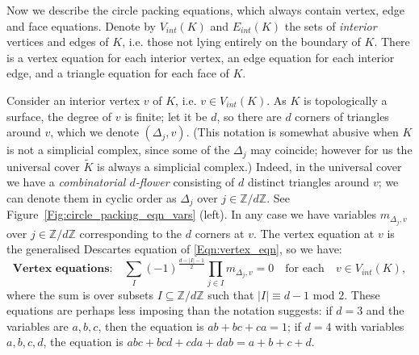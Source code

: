 \documentclass[12pt]{amsart}
\numberwithin{equation}{section}
\theoremstyle{named}
\newcommand{\reffig}[1]{Figure~\ref{Fig:#1}}
\newcommand{\refeqn}[1]{\eqref{Eqn:#1}}
\newcommand{\Z}{\mathbb{Z}}
\begin{document}
Now we describe the circle packing equations, which always contain vertex, edge and face equations. Denote by $V_{int}(K)$ and $E_{int}(K)$ the sets of \emph{interior} vertices and edges of $K$, i.e. those not lying entirely on the boundary of $K$. There is a vertex equation for each interior vertex, an edge equation for each interior edge, and a triangle equation for each face of $K$.

Consider an interior vertex $v$ of $K$, i.e. $v \in V_{int}(K)$. As $K$ is topologically a surface, the degree of $v$ is finite; let it be $d$, so there are $d$ corners of triangles around $v$, which we denote $(\Delta_j, v)$. (This notation is somewhat abusive when $K$ is not a simplicial complex, since some of the $\Delta_j$ may coincide; however for us the universal cover $\widetilde{K}$ is always a simplicial complex.) Indeed, in the universal cover we have a 
\emph{combinatorial $d$-flower} consisting of $d$ distinct triangles around $v$; we can denote them in cyclic order as $\Delta_j$ over $j \in\Z/d\Z$. See \reffig{circle_packing_eqn_vars} (left). In any case we have variables $m_{\Delta_j,v}$ over $j \in \Z/d\Z$ corresponding to the $d$ corners at $v$. The vertex equation at $v$ is the generalised Descartes equation of \refeqn{vertex_eqn}, so we have:
\begin{equation}
\label{Eqn:vertex_eqn_list}
\textbf{Vertex equations:} \quad
\sum_{I} (-1)^{\frac{ d-|I|-1 }{2} } \prod_{j \in I} m_{\Delta_j,v} = 0 \quad \text{for each} \quad v \in V_{int}(K),
\end{equation}
where the sum is over subsets $I \subseteq \Z/d\Z$ such that $|I| \equiv d-1$ mod $2$. These equations are perhaps less imposing than the notation suggests: if $d=3$ and the variables are $a,b,c$, then the equation is $ab+bc+ca=1$; if $d=4$ with variables $a,b,c,d$, the equation is $abc+bcd+cda+dab=a+b+c+d$.
\end{document}
